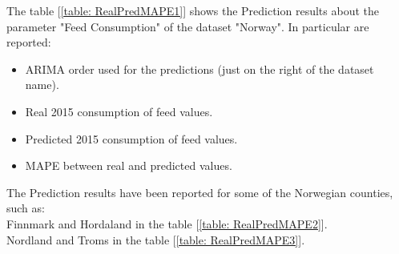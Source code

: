 \newpage

The table [\ref{table: RealPredMAPE1}] shows the Prediction results about the parameter "Feed Consumption" of the dataset "Norway".  In particular are reported:
\vspace{-5mm}
\begin{itemize}
 \setlength{\itemsep}{-5pt} 
 \item ARIMA order used for the predictions (just on the right of the dataset name).
 \item Real 2015 consumption of feed values. 
 \item Predicted 2015 consumption of feed values.
 \item MAPE between real and predicted values.
\end{itemize}

The Prediction results have been reported for some of the Norwegian counties, such as:\\
Finnmark and Hordaland in the table [\ref{table: RealPredMAPE2}]. \\ Nordland and Troms in the table [\ref{table: RealPredMAPE3}].


\vspace{+15mm}


\begin{table}[ht]
    \caption[Norway: Predicted feed consumption values: Real, Pred, Error. ]{Comparison between real 2015 "feed consumption" values and their prediction, with the corresponding MAPE for the counties: Norway}
    \label{table: RealPredMAPE1}
\end{table}

